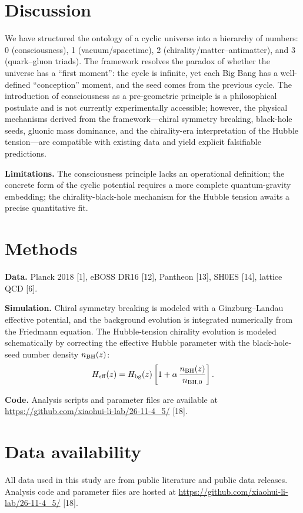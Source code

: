 \documentclass[11pt,a4paper]{article}
\begin{document}
\section{Discussion}
We have structured the ontology of a cyclic universe into a hierarchy of numbers: 0 (consciousness), 1 (vacuum/spacetime), 2 (chirality/matter--antimatter), and 3 (quark--gluon triads). The framework resolves the paradox of whether the universe has a ``first moment'': the cycle is infinite, yet each Big Bang has a well-defined ``conception'' moment, and the seed comes from the previous cycle. The introduction of consciousness as a pre-geometric principle is a philosophical postulate and is not currently experimentally accessible; however, the physical mechanisms derived from the framework---chiral symmetry breaking, black-hole seeds, gluonic mass dominance, and the chirality-era interpretation of the Hubble tension---are compatible with existing data and yield explicit falsifiable predictions.

\noindent\textbf{Limitations.} The consciousness principle lacks an operational definition; the concrete form of the cyclic potential requires a more complete quantum-gravity embedding; the chirality-black-hole mechanism for the Hubble tension awaits a precise quantitative fit.

\section{Methods}

\noindent\textbf{Data.} Planck 2018 [1], eBOSS DR16 [12], Pantheon [13], SH0ES [14], lattice QCD [6].

\noindent\textbf{Simulation.} Chiral symmetry breaking is modeled with a Ginzburg--Landau effective potential, and the background evolution is integrated numerically from the Friedmann equation. The Hubble-tension chirality evolution is modeled schematically by correcting the effective Hubble parameter with the black-hole-seed number density $n_{\rm BH}(z)$:
\begin{equation}
H_{\rm eff}(z)=H_{\rm bg}(z)\left[1+\alpha\,\frac{n_{\rm BH}(z)}{n_{\rm BH,0}}\right].
\end{equation}

\noindent\textbf{Code.} Analysis scripts and parameter files are available at \url{https://github.com/xiaohui-li-lab/26-11-4_5/} [18].

\section*{Data availability}
All data used in this study are from public literature and public data releases. Analysis code and parameter files are hosted at \url{https://github.com/xiaohui-li-lab/26-11-4_5/} [18].
\end{document}
